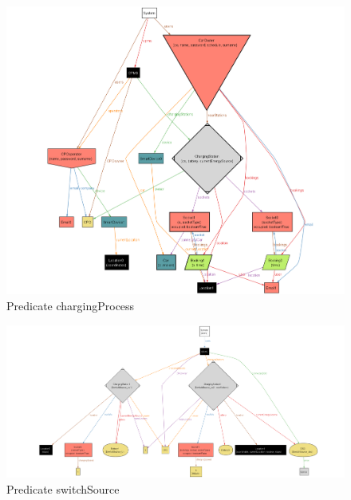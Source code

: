 \documentclass[table, 12pt]{article} %
\begin{document}
    \begin{center}
        \begin{figure}[H]
            \includegraphics[scale=0.41, center]{assets/alloy/pred_chargingProcess.png}
            \caption{Predicate chargingProcess}
            \label{fig: chargingProcess_alloy}
        \end{figure}
    \end{center}

    \begin{figure}
        \centering
            \includegraphics[scale=0.33, center]{assets/alloy/pred_switchSources.png}
            \caption{Predicate switchSource}
            \label{fig: switchSources_alloy}
        \end{figure}
    

    
\end{document}
